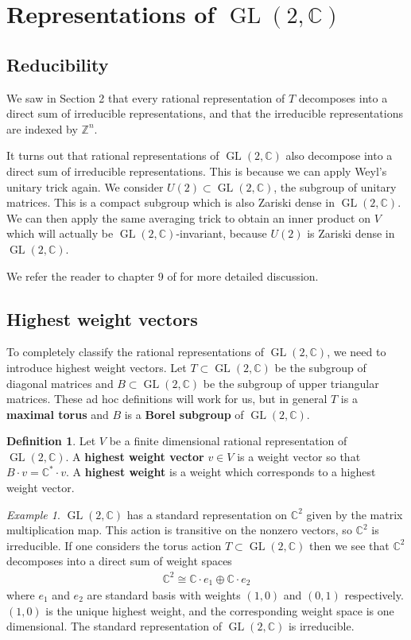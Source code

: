\documentclass[manuscript, printscheme]{aomart}
\theoremstyle{plain} %
\theoremstyle{definition}
\newtheorem{definition}[equation]{Definition}
\theoremstyle{remark}
\newtheorem{example}[equation]{Example}
\DeclareMathOperator{\GL}{GL}
\newcommand{\C}{\mathbb{C}}
\newcommand{\Z}{\mathbb{Z}}
\begin{document}
\section{Representations of $\GL(2,\C)$}

\subsection{Reducibility}
We saw in Section 2 that every rational representation of $T$ decomposes into a direct sum of irreducible representations,
and that the irreducible representations are indexed by $\Z^n$.

\hfill

It turns out that rational representations of $\GL(2,\C)$
also decompose into a direct sum of irreducible representations. This is
because we can apply Weyl's unitary trick again. We consider $U(2)\subset \GL(2,\C)$, the subgroup of unitary matrices.
This is a compact subgroup which is also Zariski dense in $\GL(2,\C)$. We can then apply the same averaging trick
to obtain an inner product on $V$ which will actually be $\GL(2,\C)$-invariant, because $U(2)$ is Zariski dense in $\GL(2,\C)$.

\hfill 

We refer the reader to chapter 9 of \cite{fulton-harris} for more detailed discussion.


\subsection{Highest weight vectors}
To completely classify the rational representations of $\GL(2,\C)$, we need to introduce highest weight vectors.
Let $T\subset \GL(2,\C)$ be the subgroup of diagonal matrices and $B \subset \GL(2,\C)$ be the subgroup of upper triangular matrices.
These ad hoc definitions will work for us, but in general $T$ is a \textbf{maximal torus} and $B$ is a \textbf{Borel subgroup} of $\GL(2,\C)$.
\begin{definition}
	Let $V$ be a finite dimensional rational representation of $\GL(2,\C)$. A \textbf{highest weight vector} $v\in V$ is
	a weight vector so that $B\cdot v = \C^*\cdot v$. A \textbf{highest weight} is a weight which
	corresponds to a highest weight vector.
\end{definition}

\begin{example}
	$\GL(2,\C)$ has a standard representation on $\C^2$ given by the matrix multiplication map. This action
	is transitive on the nonzero vectors, so $\C^2$ is irreducible. If one considers the torus action $T\subset \GL(2,\C)$
	then we see that $\C^2$ decomposes into a direct sum of weight spaces \begin{align*}
		\C^2 \cong \C\cdot e_1 \oplus \C\cdot e_2
	\end{align*} where $e_1$ and $e_2$ are standard basis with weights $(1,0)$ and $(0,1)$ respectively.
	$(1,0)$ is the unique highest weight, and the corresponding weight space is one dimensional. The standard
	representation of $\GL(2,\C)$ is irreducible.
\end{example}
\end{document}
